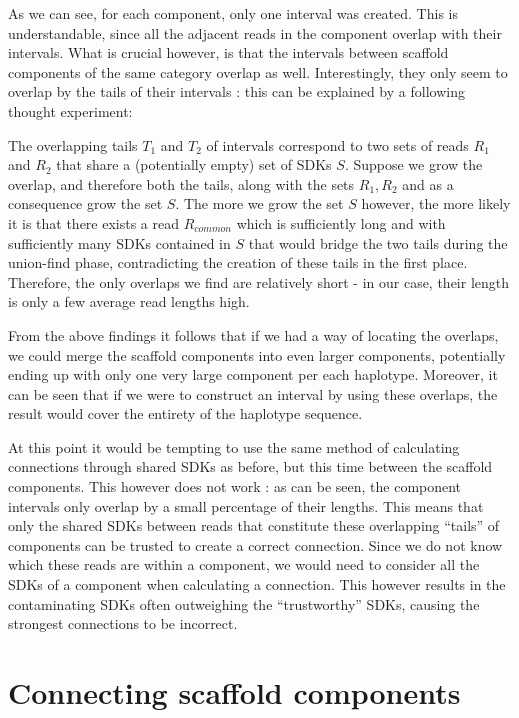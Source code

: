 As we can see, for each component, only one interval was created. This is understandable, since all the adjacent reads in the component overlap with their intervals. 
What is crucial however, is that the intervals between scaffold components of the same category overlap as well. Interestingly, they only seem to overlap by the tails of their intervals : this can be explained by a following thought experiment:

The overlapping tails $T_1$ and $T_2$ of intervals correspond to two sets of reads $R_1$ and $R_2$ that share a (potentially empty) set of SDKs $S$. Suppose we grow the overlap, and therefore both the tails, along with the sets $R_1, R_2$ and as a consequence grow the set $S$. The more we grow the set $S$ however, the more likely it is that there exists a read $R_{common}$ which is sufficiently long and with sufficiently many SDKs contained in $S$ that would bridge the two tails during the union-find phase, contradicting the creation of these tails in the first place. Therefore, the only overlaps we find are relatively short - in our case, their length is only a few average read lengths high.

From the above findings it follows that if we had a way of locating the overlaps, we could merge the scaffold components into even larger components, potentially ending up with only one very large component per each haplotype. Moreover, it can be seen that if we were to construct an interval by using these overlaps, the result would cover the entirety of the haplotype sequence.

At this point it would be tempting to use the same method of calculating connections through shared SDKs as before, but this time between the scaffold components. This however does not work : as can be seen, the component intervals only overlap by a small percentage of their lengths. This means that only the shared SDKs between reads that constitute these overlapping “tails” of components can be trusted to create a correct connection. Since we do not know which these reads are within a component, we would need to consider all the SDKs of a component when calculating a connection. This however results in the contaminating SDKs often outweighing the “trustworthy” SDKs, causing the strongest connections to be incorrect.

\section{Connecting scaffold components}

